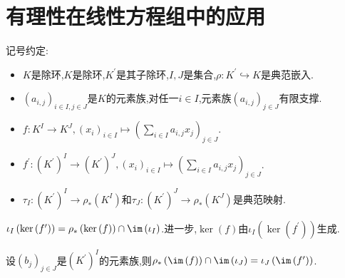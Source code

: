 \section{有理性在线性方程组中的应用}

记号约定:

\begin{itemize}
	\item $K$是除环,$K$是除环,$K^{\prime}$是其子除环,$I,J$是集合,$\rho:K^{\prime}\hookrightarrow K$是典范嵌入.
	\item $\left(a_{i,j}\right)_{i\in I,j\in J}$是$K$的元素族,对任一$i\in I$,元素族$\left(a_{i,j}\right)_{j\in J}$有限支撑.
	\item $f:K^{I}\to K^{J},\left(x_{i}\right)_{i\in I}\mapsto\left(\sum\limits_{i\in I}a_{i,j}x_{j}\right)_{j\in J}$.
	\item $f^{\prime}:\left(K^{\prime}\right)^{I}\to \left(K^{\prime}\right)^{J},\left(x_{i}\right)_{i\in I}\mapsto\left(\sum\limits_{i\in I}a_{i,j}x_{j}\right)_{j\in J}$.
	\item $\tau_{I}:\left(K^{\prime}\right)^{I}\to\rho_{\ast}\left(K^{I}\right)$和$\tau_{J}:\left(K^{\prime}\right)^{J}\to\rho_{\ast}\left(K^{J}\right)$是典范映射.
\end{itemize}

\begin{proposition}{}{}
	$\iota_{I}\left(\ker\left(f^{\prime}\right)\right)=\rho_{\ast}\left(\ker\left(f\right)\right)\cap\im\left(\iota_{I}\right)$.进一步,$\ker\left(f\right)$由$\iota_{I}\left(\ker\left(f^{\prime}\right)\right)$生成.
\end{proposition}

\begin{proposition}{}{}
	设$\left(b_{j}\right)_{j\in J}$是$\left(K^{\prime}\right)^{I}$的元素族,则$\rho_{\ast}\left(\im\left(f\right)\right)\cap\im\left(\iota_{J}\right)=\iota_{J}\left(\im\left(f^{\prime}\right)\right)$.
\end{proposition}







